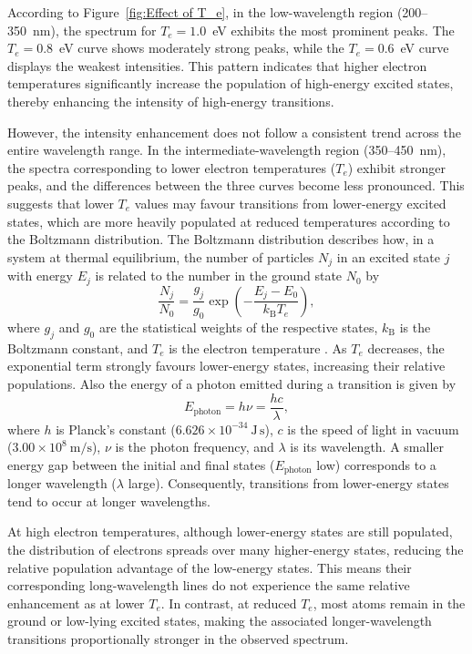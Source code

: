 \documentclass[12pt,a4paper]{article}
\begin{document}
	According to Figure~\ref{fig:Effect of T_e}, in the low-wavelength region (200--350~nm), the spectrum for $T_e = 1.0$~eV exhibits the most prominent peaks. The $T_e = 0.8$~eV curve shows moderately strong peaks, while the $T_e = 0.6$~eV curve displays the weakest intensities. This pattern indicates that higher electron temperatures significantly increase the population of high-energy excited states, thereby enhancing the intensity of high-energy transitions.  
	
	However, the intensity enhancement does not follow a consistent trend across the entire wavelength range. In the intermediate-wavelength region (350--450~nm), the spectra corresponding to lower electron temperatures ($T_e$) exhibit stronger peaks, and the differences between the three curves become less pronounced. This suggests that lower $T_e$ values may favour transitions from lower-energy excited states, which are more heavily populated at reduced temperatures according to the Boltzmann distribution. The Boltzmann distribution describes how, in a system at thermal equilibrium, the number of particles $N_j$ in an excited state $j$ with energy $E_j$ is related to the number in the ground state $N_0$ by  
	\[
	\frac{N_j}{N_0} = \frac{g_j}{g_0} \exp\left(-\frac{E_j - E_0}{k_\mathrm{B} T_e}\right),
	\]  
	where $g_j$ and $g_0$ are the statistical weights of the respective states, $k_\mathrm{B}$ is the Boltzmann constant, and $T_e$ is the electron temperature \cite{Cremers2013LIBSHandbook}. As $T_e$ decreases, the exponential term strongly favours lower-energy states, increasing their relative populations. Also the  energy of a photon emitted during a transition is given by  
	\[
	E_{\text{photon}} = h\nu = \frac{hc}{\lambda},
	\]  
	where \(h\) is Planck’s constant (\(6.626\times10^{-34}~\mathrm{J\,s}\)), \(c\) is the speed of light in vacuum (\(3.00\times10^8~\mathrm{m/s}\)), \(\nu\) is the photon frequency, and \(\lambda\) is its wavelength. A smaller energy gap between the initial and final states (\(E_{\text{photon}}\) low) corresponds to a longer wavelength (\(\lambda\) large). Consequently, transitions from lower-energy states tend to occur at longer wavelengths.  
	
	At high electron temperatures, although lower-energy states are still populated, the distribution of electrons spreads over many higher-energy states, reducing the relative population advantage of the low-energy states. This means their corresponding long-wavelength lines do not experience the same relative enhancement as at lower $T_e$. In contrast, at reduced $T_e$, most atoms remain in the ground or low-lying excited states, making the associated longer-wavelength transitions proportionally stronger in the observed spectrum.  
	
\end{document}
